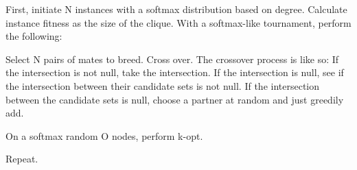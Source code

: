 \documentclass{article}
\begin{document}
First, initiate N instances with a softmax distribution based on degree.
Calculate instance fitness as the size of the clique.
With a softmax-like tournament, perform the following:

Select N pairs of mates to breed.
Cross over. The crossover process is like so:
    If the intersection is not null, take the intersection.
    If the intersection is null, see if the intersection between their candidate sets is not null.
    If the intersection between the candidate sets is null, choose a partner at random and just greedily add.

On a softmax random O nodes, perform k-opt.

Repeat.

\begin{algorithm}
\caption{Genetic Algorithm}\label{alg:euclid}
\begin{algorithmic}[1] %
    \State 
\EndProcedure
\end{algorithmic}
\end{algorithm}
\end{document}
